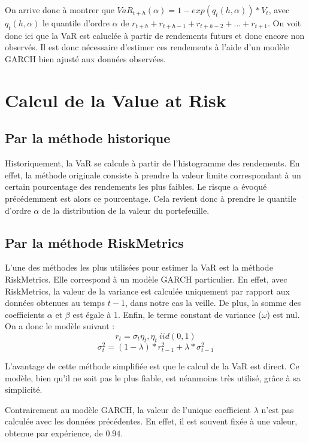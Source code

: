 			On arrive donc à montrer que $VaR_{t+h}(\alpha) = 1 - exp{(q_{t}(h,\alpha))}*V_{t}$, avec $q_{t}(h,\alpha)$ le quantile d'ordre $\alpha$ de $r_{t+h}+r_{t+h-1}+r_{t+h-2}+...+r_{t+1}$. On voit donc ici que la VaR est caluclée à partir de rendements futurs et donc encore non observés. Il est donc nécessaire d'estimer ces rendements à l'aide d'un modèle GARCH bien ajusté aux données observées.
	
	\section{Calcul de la Value at Risk}

		\subsection{Par la méthode historique}
		\label{subsubsection:methode-historique}
			Historiquement, la VaR se calcule à partir de l'histogramme des rendements. En effet, la méthode originale consiste à prendre la valeur limite correspondant à un certain pourcentage des rendements les plus faibles. Le risque $\alpha$ évoqué précédemment est alors ce pourcentage. Cela revient donc à prendre le quantile d'ordre $\alpha$ de la distribution de la valeur du portefeuille.


		\subsection{Par la méthode RiskMetrics}
		\label{subsubsection:methode-riskmetrics}
			L'une des méthodes les plus utilisées pour estimer la VaR est la méthode RiskMetrics. Elle correspond à un modèle GARCH particulier. En effet, avec RiskMetrics, la valeur de la variance est calculée uniquement par rapport aux données obtenues au temps $t-1$, dans notre cas la veille. De plus, la somme des coefficients $\alpha$ et $\beta$ est égale à 1. Enfin, le terme constant de variance ($\omega$) est nul. On a donc le modèle suivant :
			\[r_t = \sigma_t\eta_t , \eta_t~iid(0,1)\]
			\[\sigma_t^2 = (1-\lambda)*r_{t-1}^2+\lambda*\sigma_{t-1}^2\]

			L'avantage de cette méthode simplifiée est que le calcul de la VaR est direct. Ce modèle, bien qu'il ne soit pas le plus fiable, est néanmoins très utilisé, grâce à sa simplicité.

			Contrairement au modèle GARCH, la valeur de l'unique coefficient $\lambda$ n'est pas calculée avec les données précédentes. En effet, il est souvent fixée à une valeur, obtenue par expérience, de $0.94$.


